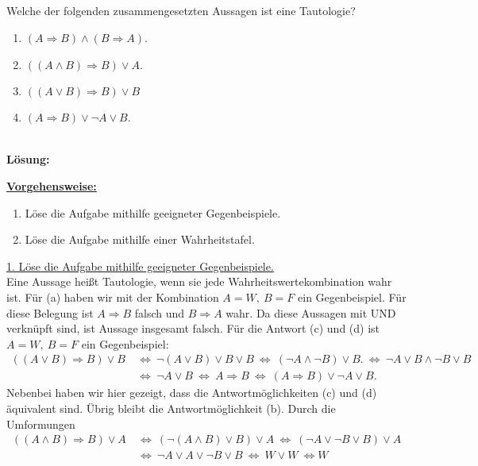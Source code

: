 \subsection*{}
Welche der folgenden zusammengesetzten Aussagen ist eine Tautologie? 
\renewcommand{\labelenumi}{(\alph{enumi})}
\begin{enumerate}
	\item $(A \Rightarrow B ) \wedge (B \Rightarrow A)$.
	\item $ ((A \wedge B) \Rightarrow B) \vee A$.
	\item $ ((A \vee B) \Rightarrow B) \vee B$
	\item $(A \Rightarrow B ) \vee \neg A \vee B$.
\end{enumerate}
\ \\
\textbf{Lösung:}
\begin{mdframed}
	\underline{\textbf{Vorgehensweise:}}
	\renewcommand{\labelenumi}{\theenumi.}
	\begin{enumerate}
		\item Löse die Aufgabe mithilfe geeigneter Gegenbeispiele.
		\item Löse die Aufgabe mithilfe einer Wahrheitstafel.
	\end{enumerate}
\end{mdframed}
\underline{1. Löse die Aufgabe mithilfe geeigneter Gegenbeispiele.}\\
Eine Aussage heißt Tautologie, wenn sie jede Wahrheitswertekombination wahr ist.
Für (a) haben wir mit der Kombination $A = W, \ B = F$ ein Gegenbeispiel. Für diese Belegung ist $A \Rightarrow B$ falsch und $  B \Rightarrow A$ wahr. Da diese Aussagen mit UND verknüpft sind, ist Aussage insgesamt falsch.
Für die Antwort (c) und (d) ist $A = W, \ B = F$ ein Gegenbeispiel:
\begin{align*}
	((A \vee B) \Rightarrow B) \vee B
	\ &\Leftrightarrow \
	\neg(A \vee B ) \vee B \vee B
	\ \Leftrightarrow \
	(\neg A \wedge \neg B) \vee B.
	\ \Leftrightarrow \
	\neg A \vee B \wedge \neg B \vee B\\
	\ &\Leftrightarrow \
	\neg A \vee B 
	\ \Leftrightarrow \
	A \Rightarrow B
	\ \Leftrightarrow \
	(A \Rightarrow B) \vee \neg A \vee B.
\end{align*}
Nebenbei haben wir hier gezeigt, dass die Antwortmöglichkeiten (c) und (d) äquivalent sind. Übrig bleibt die Antwortmöglichkeit (b). Durch die Umformungen
\begin{align*}
	((A \wedge B) \Rightarrow B) \vee A
	\ &\Leftrightarrow \
	(\neg (A \wedge B) \vee B) \vee A
	\ \Leftrightarrow \
	(\neg A \vee \neg B \vee B) \vee A\\
	\ &\Leftrightarrow \
	\neg A \vee A \vee \neg B \vee B
	\ \Leftrightarrow \
	W \vee W \ \Leftrightarrow W
\end{align*}
